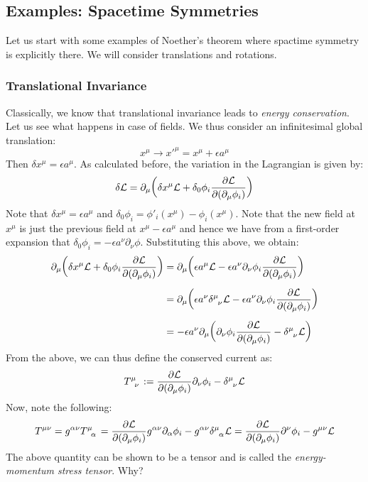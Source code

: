 \subsection{Examples: Spacetime Symmetries}
Let us start with some examples of Noether's theorem where spactime symmetry is explicitly there. We will consider translations and rotations. 
\subsubsection{Translational Invariance}
Classically, we know that translational invariance leads to \textit{energy conservation}. Let us see what happens in case of fields. We thus consider an infinitesimal global translation:
$$x^\mu\rightarrow x'^\mu = x^\mu+\epsilon a^\mu$$
Then $\delta x^\mu = \epsilon a^\mu$. As calculated before, the variation in the Lagrangian is given by:
$$\delta\mathcal L = \partial_\mu\qty(\delta x^\mu \mathcal L + \delta_0\phi_i \pdv{\mathcal L}{(\partial_\mu\phi_i)})$$
Note that $\delta x^\mu = \epsilon a^\mu$ and $\delta_0\phi_i = \phi'_i(x^\mu) - \phi_i(x^\mu)$. Note that the new field at $x^\mu$ is just the previous field at $x^\mu - \epsilon a^\mu$ and hence we have from a first-order expansion that $\delta_0\phi_i = -\epsilon a^\nu \partial_\nu\phi$. Substituting this above, we obtain:
\begin{align*}
    \partial_\mu \qty(
        \delta x^\mu \SL 
        + \delta_0 \phi_i \pdv{\SL}{(\partial_\mu \phi_i)}
    )
    &= \partial_\mu \qty(
        \epsilon a^\mu \SL 
        - \epsilon a^\nu \partial_\nu \phi_i \pdv{\SL}{(\partial_\mu \phi_i)}
   ) \\[0.5em]
    &= \partial_\mu \qty(
        \epsilon a^\nu \tsr{\delta}{\mu}{\nu} \SL 
        - \epsilon a^\nu \partial_\nu \phi_i \pdv{\SL}{(\partial_\mu \phi_i)}
   ) \\[0.5em]
    &= -\epsilon a^\nu \partial_\mu\qty(\partial_\nu \phi_i \pdv{\SL}{(\partial_\mu \phi_i)}-\tsr{\delta}{\mu}{\nu}\SL)
\end{align*}
From the above, we can thus define the conserved current as:
$$\tsr{T}{\mu}{\nu} := \pdv{\SL}{(\partial_\mu \phi_i)}\partial_\nu \phi_i-\tsr{\delta}{\mu}{\nu}\SL$$
Now, note the following:
$$T^{\mu\nu} = g^{\alpha\nu}\tsr{T}{\mu}{\alpha} = \pdv{\SL}{(\partial_\mu \phi_i)}g^{\alpha\nu}\partial_\alpha \phi_i-g^{\alpha\nu}\tsr{\delta}{\mu}{\alpha}\SL = \pdv{\SL}{(\partial_\mu \phi_i)}\partial^\nu\phi_i-g^{\mu\nu}\SL$$
The above quantity can be shown to be a tensor and is called the \textit{energy-momentum stress tensor}. Why?\\[0.2cm]
